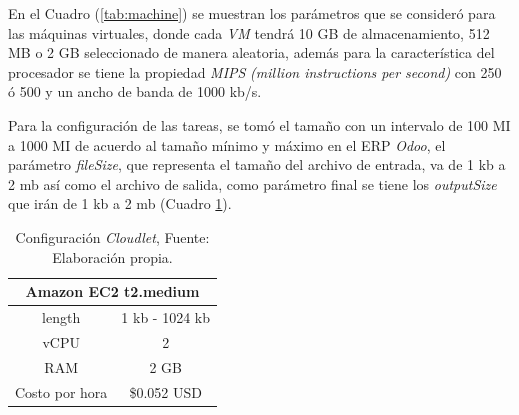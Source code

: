 En el Cuadro (\ref{tab:machine}) se muestran los par\'ametros que se consider\'o para las m\'aquinas virtuales, donde cada \textit{VM} tendr\'a 10 GB de almacenamiento, 512 MB  o 2 GB seleccionado de manera aleatoria, adem\'as para la caracter\'istica del procesador se tiene  la propiedad \textit{MIPS} \textit{(million instructions per second)} con 250 \'o 500 y un ancho de banda de 1000 kb/s.

Para la configuraci\'on de las tareas, se tom\'o el tamaño con un intervalo de 100 MI a 1000 MI de acuerdo al tamaño mínimo y máximo en el ERP \textit{Odoo},  el par\'ametro \textit{fileSize}, que representa el tamaño del archivo de entrada, va de 1 kb a 2 mb as\'i como el archivo de salida, como par\'ametro final se tiene los \textit{outputSize} que ir\'an de 1 kb a 2 mb (Cuadro \ref{tab:cloudlet}).


\setcounter{table}{4}
\renewcommand\thetable{\arabic{table}}
\begin{table}[h!]
	\centering
	\begin{tabular}{@{}cc@{}}
		\toprule
		\multicolumn{2}{c}{{\bf Amazon EC2 t2.medium}} \\ \midrule
		length           & 1 kb - 1024 kb       \\
		vCPU     & 2     \\
		RAM &2 GB \\
		Costo por hora           & \$0.052 USD      \\ \midrule
		
	\end{tabular}
	\caption{Configuraci\'on \textit{Cloudlet}, Fuente: Elaboraci\'on propia.}
	\label{tab:cloudlet}
\end{table}



\newpage

